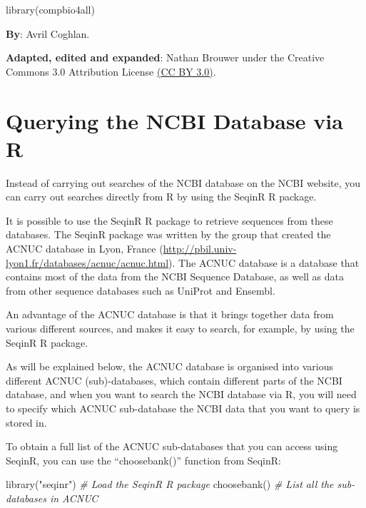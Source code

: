 \documentclass[
]{book}
\newenvironment{Shaded}{\begin{snugshade}}{\end{snugshade}}
\newcommand{\CommentTok}[1]{\textcolor[rgb]{0.56,0.35,0.01}{\textit{#1}}}
\newcommand{\FunctionTok}[1]{\textcolor[rgb]{0.00,0.00,0.00}{#1}}
\newcommand{\NormalTok}[1]{#1}
\newcommand{\StringTok}[1]{\textcolor[rgb]{0.31,0.60,0.02}{#1}}
\begin{document}
\begin{Shaded}
\begin{Highlighting}[]
\FunctionTok{library}\NormalTok{(compbio4all)}
\end{Highlighting}
\end{Shaded}

\textbf{By}: Avril Coghlan.

\textbf{Adapted, edited and expanded}: Nathan Brouwer under the Creative Commons 3.0 Attribution License \href{https://creativecommons.org/licenses/by/3.0/}{(CC BY 3.0)}.

\hypertarget{querying-the-ncbi-database-via-r}{%
\section{Querying the NCBI Database via R}\label{querying-the-ncbi-database-via-r}}

Instead of carrying out searches of the NCBI database on the NCBI website, you can carry out searches directly from R by using the SeqinR R package.

It is possible to use the SeqinR R package to retrieve sequences from these databases. The SeqinR package was written by the group that created the ACNUC database in Lyon, France (\url{http://pbil.univ-lyon1.fr/databases/acnuc/acnuc.html}). The ACNUC database is a database that contains most of the data from the NCBI Sequence Database, as well as data from other sequence databases such as UniProt and Ensembl.

An advantage of the ACNUC database is that it brings together data from various different sources, and makes it easy to search, for example, by using the SeqinR R package.

As will be explained below, the ACNUC database is organised into various different ACNUC (sub)-databases, which contain different parts of the NCBI database, and when you want to search the NCBI database via R, you will need to specify which ACNUC sub-database the NCBI data that you want to query is stored in.

To obtain a full list of the ACNUC sub-databases that you can access using SeqinR, you can use the ``choosebank()'' function from SeqinR:

\begin{Shaded}
\begin{Highlighting}[]
\FunctionTok{library}\NormalTok{(}\StringTok{"seqinr"}\NormalTok{) }\CommentTok{\# Load the SeqinR R package}
\FunctionTok{choosebank}\NormalTok{()      }\CommentTok{\# List all the sub{-}databases in ACNUC}
\end{Highlighting}
\end{Shaded}
\end{document}
